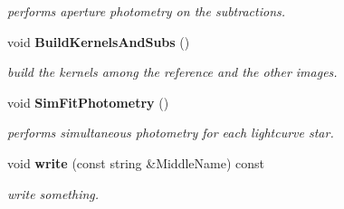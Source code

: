 \begin{CompactItemize}
\begin{CompactList}\small\item\em performs aperture photometry on the subtractions.\item\end{CompactList}\item 
{}
void {\bf Build\-Kernels\-And\-Subs} ()\label{class_lightcurvebuilder_a11}

\begin{CompactList}\small\item\em build the kernels among the reference and the other images.\item\end{CompactList}\item 
{}
void {\bf Sim\-Fit\-Photometry} ()\label{class_lightcurvebuilder_a12}

\begin{CompactList}\small\item\em performs simultaneous photometry for each lightcurve star.\item\end{CompactList}\item 
{}
void {\bf write} (const string \&Middle\-Name) const\label{class_lightcurvebuilder_a13}

\begin{CompactList}\small\item\em write something.\item\end{CompactList}\end{CompactItemize}
